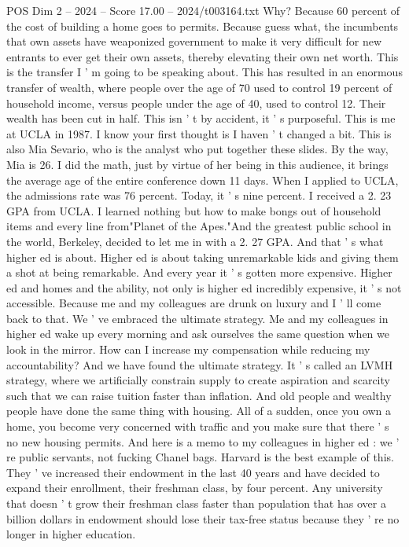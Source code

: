 \begin{textsample}{POS Dim 2 – 2024 – Score 17.00 – 2024/t003164.txt}
Why?
Because 60 percent of the cost of building a home goes to permits.
Because guess what, the incumbents that own assets have weaponized government to make it very difficult for new entrants to ever get their own assets, thereby elevating their own net worth.
This is the transfer I ' m going to be speaking about.
This has resulted in an enormous transfer of wealth, where people over the age of 70 used to control 19 percent of household income, versus people under the age of 40, used to control 12.
Their wealth has been cut in half.
This isn ' t by accident, it ' s purposeful.
This is me at UCLA in 1987.
I know your first thought is I haven ' t changed a bit.
This is also Mia Sevario, who is the analyst who put together these slides.
By the way, Mia is 26.
I did the math, just by virtue of her being in this audience, it brings the average age of the entire conference down 11 days.
When I applied to UCLA, the admissions rate was 76 percent.
Today, it ' s nine percent.
I received a 2. 23 GPA from UCLA.
I learned nothing but how to make bongs out of household items and every line from"Planet of the Apes."And the greatest public school in the world, Berkeley, decided to let me in with a 2. 27 GPA.
And that ' s what higher ed is about.
Higher ed is about taking unremarkable kids and giving them a shot at being remarkable.
And every year it ' s gotten more expensive.
Higher ed and homes and the ability, not only is higher ed incredibly expensive, it ' s not accessible.
Because me and my colleagues are drunk on luxury and I ' ll come back to that.
We ' ve embraced the ultimate strategy.
Me and my colleagues in higher ed wake up every morning and ask ourselves the same question when we look in the mirror.
How can I increase my compensation while reducing my accountability?
And we have found the ultimate strategy.
It ' s called an LVMH strategy, where we artificially constrain supply to create aspiration and scarcity such that we can raise tuition faster than inflation.
And old people and wealthy people have done the same thing with housing.
All of a sudden, once you own a home, you become very concerned with traffic and you make sure that there ' s no new housing permits.
And here is a memo to my colleagues in higher ed : we ' re public servants, not fucking Chanel bags.
Harvard is the best example of this.
They ' ve increased their endowment in the last 40 years and have decided to expand their enrollment, their freshman class, by four percent.
Any university that doesn ' t grow their freshman class faster than population that has over a billion dollars in endowment should lose their tax-free status because they ' re no longer in higher education.

\end{textsample}
